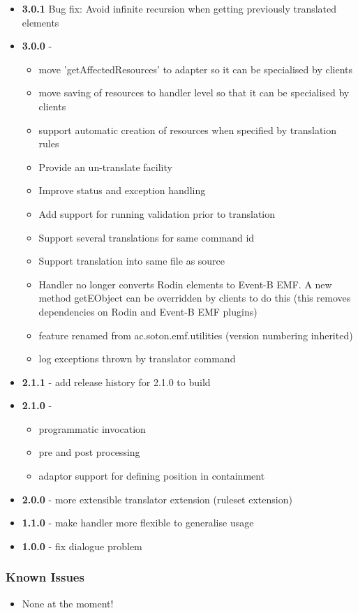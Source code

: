 \begin{itemize}
\item \textbf{3.0.1} Bug fix: Avoid infinite recursion when getting previously translated elements
\item \textbf{3.0.0} - 
	\begin{itemize}
	\item move 'getAffectedResources' to adapter so it can be specialised by clients
	\item move saving of resources to handler level so that it can be specialised by clients
	\item support automatic creation of resources when specified by translation rules
	\item Provide an un-translate facility
	\item Improve status and exception handling
	\item Add support for running validation prior to translation
	\item Support several translations for same command id
	\item Support translation into same file as source
	\item Handler no longer converts Rodin elements to Event-B EMF. A new method getEObject can be overridden by clients to do this	(this removes dependencies on Rodin and Event-B EMF plugins)
	\item feature renamed from ac.soton.emf.utilities (version numbering inherited)
	\item log exceptions thrown by translator command
	\end{itemize}
\item \textbf{2.1.1} - add release history for 2.1.0 to build
\item \textbf{2.1.0} - 
	\begin{itemize}
	\item programmatic invocation
	\item pre and post processing
	\item adaptor support for defining position in containment
	\end{itemize}
\item \textbf{2.0.0} - more extensible translator extension (ruleset extension)
\item \textbf{1.1.0} - make handler more flexible to generalise usage
\item \textbf{1.0.0} - fix dialogue problem
\end{itemize}

\subsubsection{Known Issues}
\label{sec:known-issues}

\begin{itemize}
\item None at the moment!
\end{itemize}


